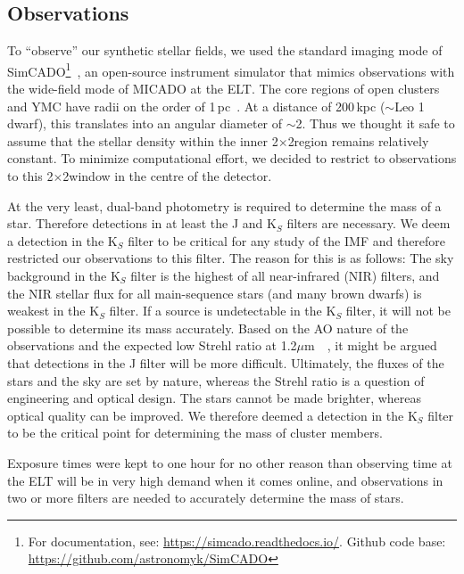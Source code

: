 \documentclass{aa}
\newcommand{\um}{$\mu$m~}
\newcommand{\s}{$\sim$}
\begin{document}
\subsection{Observations}
\label{sec:telescope}

To ``observe'' our synthetic stellar fields, we used the standard imaging mode of SimCADO\footnote{For documentation, see: \url{https://simcado.readthedocs.io/}.
Github code base: \url{https://github.com/astronomyk/SimCADO}}~\citep{leschinski2016}, an open-source instrument simulator that mimics observations with the wide-field mode of MICADO at the ELT\@.
The core regions of open clusters and YMC have radii on the order of 1\,pc~\citep{portegies2010}.
At a distance of 200\,kpc ($\sim$Leo 1 dwarf), this translates into an angular diameter of \s2\arcsec.
Thus we thought it safe to assume that the stellar density within the inner 2\arcsec$\times$2\arcsec region remains relatively constant.
To minimize computational effort, we decided to restrict to observations to this 2\arcsec$\times$2\arcsec window in the centre of the detector.

At the very least, dual-band photometry is required to determine the mass of a star.
Therefore detections in at least the J and K$_S$ filters are necessary.
We deem a detection in the K$_S$ filter to be critical for any study of the IMF and therefore restricted our observations to this filter.
The reason for this is as follows: The sky background in the K$_S$ filter is the highest of all near-infrared (NIR) filters, and the NIR stellar flux for all main-sequence stars (and many brown dwarfs) is weakest in the K$_S$ filter.
If a source is undetectable in the K$_S$ filter, it will not be possible to determine its mass accurately.
Based on the AO nature of the observations and the expected low Strehl ratio at 1.2\um~\citep{clenet2016}, it might be argued that detections in the J filter will be more difficult.
Ultimately, the fluxes of the stars and the sky are set by nature, whereas the Strehl ratio is a question of engineering and optical design.
The stars cannot be made brighter, whereas optical quality can be improved.
We therefore deemed a detection in the K$_S$ filter to be the critical point for determining the mass of cluster members.

Exposure times were kept to one hour for no other reason than observing time at the ELT will be in very high demand when it comes online, and observations in two or more filters are needed to accurately determine the mass of stars.
\end{document}
